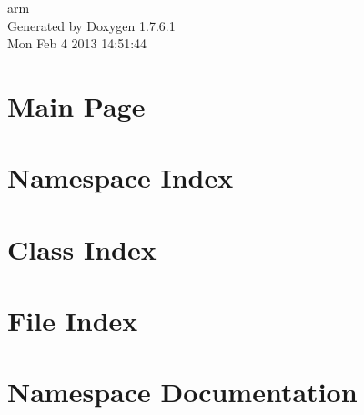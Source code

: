 \documentclass[a4paper]{book}
\begin{document}
\begin{titlepage}
\vspace*{7cm}
\begin{center}
{\Large arm }\\
\vspace*{1cm}
{\large \-Generated by Doxygen 1.7.6.1}\\
\vspace*{0.5cm}
{\small Mon Feb 4 2013 14:51:44}\\
\end{center}
\end{titlepage}
\clearemptydoublepage
{}
\tableofcontents
\clearemptydoublepage
{}
\chapter{\-Main \-Page}
\label{index}
\chapter{\-Namespace \-Index}

\chapter{\-Class \-Index}

\chapter{\-File \-Index}

\chapter{\-Namespace \-Documentation}










\end{document}
